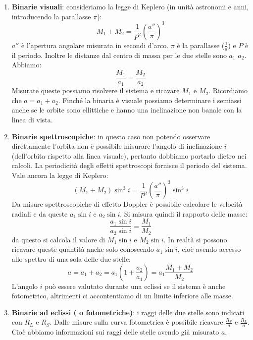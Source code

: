 \documentclass[11pt,a4paper]{article}
\begin{document}
\begin{itemize}
\begin{enumerate}
\item \textbf{Binarie visuali}: consideriamo la legge di Keplero (in unità astronomi e anni, introducendo la parallasse $\pi$):
\begin{equation}
M_1 + M_2 = \frac{1}{P^2} \left( \frac{a''}{\pi} \right)^3
\end{equation}
$a''$ è l'apertura angolare misurata in secondi d'arco. $\pi$ è la parallasse ($\frac{1}{d}$) e $P$ è il periodo. 
Inoltre le distanze dal centro di massa per le due stelle sono $a_1$ $a_2$. Abbiamo:
\begin{equation}
\frac{M_1}{a_1} = \frac{M_2}{a_2}
\end{equation}
Misurate queste possiamo risolvere il sistema e ricavare $M_1$ e $M_2$. Ricordiamo che $a = a_1 + a_2$. Finché la binaria è visuale possiamo determinare i semiassi anche se le orbite sono ellittiche e hanno una inclinazione non banale con la linea di vista.
\item \textbf{Binarie spettroscopiche}: in questo caso non potendo osservare direttamente l'orbita non è possibile misurare l'angolo di inclinazione $i$ (dell'orbita rispetto alla linea visuale), pertanto dobbiamo portarlo dietro nei calcoli. La periodicità degli effetti spettroscopi fornisce il periodo del sistema. Vale ancora la legge di Keplero:
\begin{equation}
(M_1 + M_2) \sin^3 i = \frac{1}{P^2} \left( \frac{a''}{\pi} \right)^3 \sin^3 i
\end{equation}
Da misure spettroscopiche di effetto Doppler è possibile calcolare le velocità radiali e da queste $a_1 \sin i$ e $a_2 \sin i$. Si misura quindi il rapporto delle masse:
\begin{equation}
\frac{a_1 \sin i}{a_2 \sin i} = \frac{M_1}{M_2}
\end{equation}
da questo si calcola il valore di $M_1 \sin i$ e $M_2 \sin i$. In realtà si possono ricavare queste quantità anche solo conoscendo $a_1 \sin i$, cioè avendo accesso allo spettro di una sola delle due stelle:
\begin{equation}
a = a_1 + a_2 = a_1 \left( 1 + \frac{a_2}{a_1} \right) = a_1 \frac{M_1+M_2}{M_2}
\end{equation}
L'angolo $i$ può essere valutato durante una eclissi se il sistema è anche fotometrico, altrimenti ci accontentiamo di un limite inferiore alle masse.
\item \textbf{Binarie ad eclissi ( o fotometriche)}:
i raggi delle due stelle sono indicati con $R_L$ e $R_S$. Dalle misure sulla curva fotometrica è possibile ricavare $\frac{R_S}{a}$ e $\frac{R_L}{a}$. Cioè abbiamo informazioni sui raggi delle stelle avendo già misurato $a$.
\end{enumerate}


\end{itemize}
\end{document}
